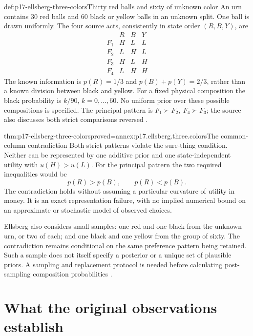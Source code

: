\begin{hbdefinition}{def:p17-ellsberg-three-colors}{Thirty red balls and sixty of unknown color}
An urn contains 30 red balls and 60 black or yellow balls
in an unknown split. One ball is drawn uniformly.
The four source acts, consistently in state order \((R,B,Y)\),
are
\[
\begin{array}{c|ccc}
 &R&B&Y\\ \hline
 F_1&H&L&L\\
 F_2&L&H&L\\
 F_3&H&L&H\\
 F_4&L&H&H
\end{array}
\]
The known information is \(p(R)=1/3\) and
\(p(B)+p(Y)=2/3\), rather than a known division between
black and yellow. For a fixed physical composition the
black probability is \(k/90\), \(k=0,\ldots,60\).
No uniform prior over these possible compositions is specified.
The principal pattern is
\(F_1\succ F_2,\ F_4\succ F_3\); the source also discusses
both strict comparisons reversed
\cite[pp.~653--656]{Ellsberg1961Ambiguity}.
\end{hbdefinition}

\begin{hbtheorem}{thm:p17-ellsberg-three-colors}{proved=annex:p17.ellsberg.three.colors}{The common-column contradiction}
Both strict patterns violate the sure-thing condition.
Neither can be represented by one additive prior and one
state-independent utility with \(u(H)>u(L)\).
For the principal pattern the two required inequalities
would be
\[
                          p(R)>p(B),\qquad p(R)<p(B).
\]
The contradiction holds without assuming a particular
curvature of utility in money. It is an exact representation
failure, with no implied numerical bound on an approximate
or stochastic model of observed choices.
\end{hbtheorem}

Ellsberg also considers small samples: one red and one black
from the unknown urn, or two of each; and one black and one
yellow from the group of sixty. The contradiction remains
conditional on the same preference pattern being retained.
Such a sample does not itself specify a posterior or a unique
set of plausible priors. A sampling and replacement protocol
is needed before calculating post-sampling composition
probabilities \cite[pp.~653--654]{Ellsberg1961Ambiguity}.

\section{What the original observations establish}

